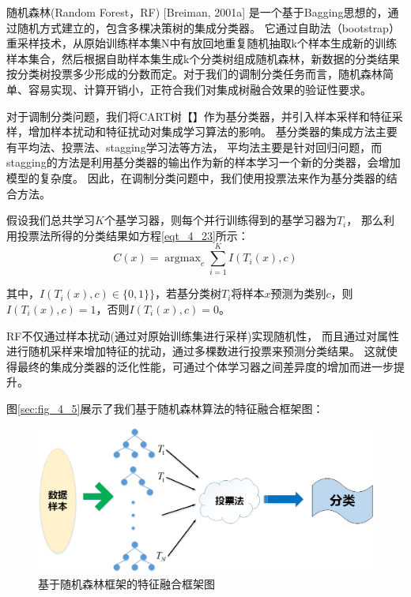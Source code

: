 随机森林(Random Forest，RF) [Breiman, 2001a] 是一个基于Bagging思想的，通过随机方式建立的，包含多棵决策树的集成分类器。
它通过自助法（bootstrap）重采样技术，从原始训练样本集N中有放回地重复随机抽取k个样本生成新的训练样本集合，然后根据自助样本集生成k个分类树组成随机森林，新数据的分类结果按分类树投票多少形成的分数而定。对于我们的调制分类任务而言，随机森林简单、容易实现、计算开销小，正符合我们对集成树融合效果的验证性要求。\par


对于调制分类问题，我们将CART树【】作为基分类器，并引入样本采样和特征采样，增加样本扰动和特征扰动对集成学习算法的影响。
基分类器的集成方法主要有平均法、投票法、stagging学习法等方法，
平均法主要是针对回归问题，而stagging的方法是利用基分类器的输出作为新的样本学习一个新的分类器，会增加模型的复杂度。
因此，在调制分类问题中，我们使用投票法来作为基分类器的结合方法。\par

假设我们总共学习$K$个基学习器，则每个并行训练得到的基学习器为$T_{i}$，
那么利用投票法所得的分类结果如方程\ref{eqt_4_23}所示：
\begin{equation}
	\label{eqt_4_23}
	C(x) = \mathop{\arg\max}_{c} \sum_{i=1}^{K} I(T_i(x), c)
\end{equation}

其中，$I(T_i(x), c) \in \{0, 1\}\}$，若基分类树$T_{i}$将样本$x$预测为类别$c$，则$I(T_i(x), c)=1$，否则$I(T_i(x), c)=0$。\par
RF不仅通过样本扰动(通过对原始训练集进行采样)实现随机性，
而且通过对属性进行随机采样来增加特征的扰动，通过多棵数进行投票来预测分类结果。
这就使得最终的集成分类器的泛化性能，可通过个体学习器之间差异度的增加而进一步提升。\par
图\ref{sec:fig_4_5}展示了我们基于随机森林算法的特征融合框架图：
\begin{figure}[!h]
	\centering
	\includegraphics[scale=0.5]{figures/chapter_4/fig_4_4}
	\caption{基于随机森林框架的特征融合框架图}\label{sec:fig_4_4}
\end{figure}



